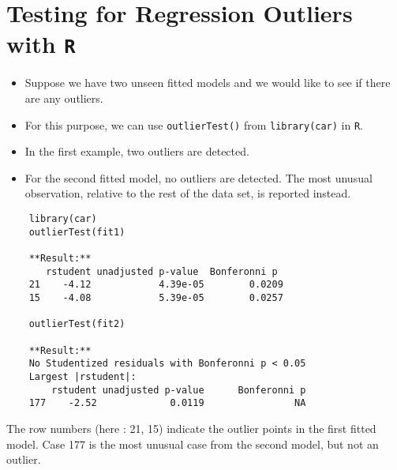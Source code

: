 \documentclass[residuals.tex]{subfiles}
\begin{document}
\Large
\section*{Testing for Regression Outliers with \texttt{R}}
\begin{itemize}
\item Suppose we have  two unseen fitted models and we would like to see if there are any outliers. 

\item For this purpose, we can use \texttt{outlierTest()} from \texttt{library(car)} in \texttt{R}.
\item In the first example, two outliers are detected.
\item For the second fitted model, no outliers are detected. The most unusual observation, relative to the rest of the data set, is reported instead.
\end{itemize}
 



\begin{framed}
	\begin{verbatim}
	library(car)
	outlierTest(fit1)   
	
	**Result:**
	   rstudent unadjusted p-value  Bonferonni p
	21    -4.12            4.39e-05        0.0209
	15    -4.08            5.39e-05        0.0257
	
	outlierTest(fit2)   
	
	**Result:**
	No Studentized residuals with Bonferonni p < 0.05
	Largest |rstudent|:
  	    rstudent unadjusted p-value      Bonferonni p
	177    -2.52             0.0119                NA
	\end{verbatim}
\end{framed}

The row numbers (here : 21, 15) indicate the outlier points in the first fitted model. Case 177 is the most unusual case from the second model, but not an outlier.
\end{document}
